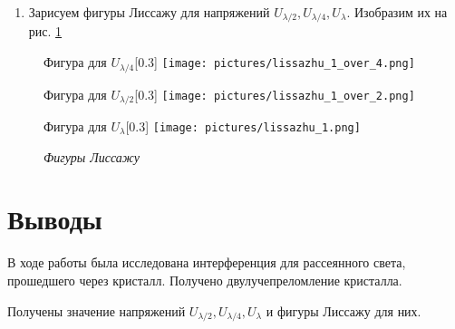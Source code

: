 \documentclass[a4paper,12pt]{article}
\begin{document}
\begin{enumerate}[resume]
    \item Зарисуем фигуры Лиссажу для напряжений $U_{\lambda/2}, U_{\lambda/4}, U_{\lambda}$. Изобразим их на рис. \ref{fig:lissazhu}
\end{enumerate}

\begin{figure}[h!]
    \centering
    \begin{subcaptionbox}{Фигура для $U_{\lambda/4}$\label{fig:img1}}[0.3\textwidth]
        {\texttt{[image: pictures/lissazhu\_1\_over\_4.png]}}
    \end{subcaptionbox}
    \hfill
    \begin{subcaptionbox}{Фигура для $U_{\lambda/2}$\label{fig:img2}}[0.3\textwidth]
        {\texttt{[image: pictures/lissazhu\_1\_over\_2.png]}}
    \end{subcaptionbox}
    \hfill
    \begin{subcaptionbox}{Фигура для $U_{\lambda}$\label{fig:img3}}[0.3\textwidth]
        {\texttt{[image: pictures/lissazhu\_1.png]}}
    \end{subcaptionbox}
    \caption{\textit{Фигуры Лиссажу}}
    \label{fig:lissazhu}
\end{figure}

\section{Выводы}

В ходе работы была исследована интерференция для рассеянного света, прошедшего через кристалл. Получено двулучепреломление кристалла. 

Получены значение напряжений $U_{\lambda/2}, U_{\lambda/4}, U_{\lambda}$ и фигуры Лиссажу для них.
\end{document}
